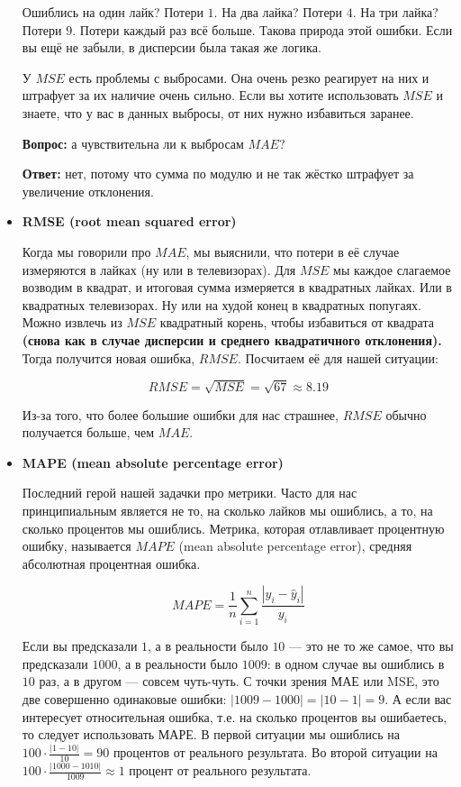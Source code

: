 \documentclass[12pt, a4paper, oneside]{article}
\theoremstyle{plain} %
\theoremstyle{definition}
\newcommand{\indef}[1]{\textbf{ \color{green} #1}}
\begin{document}
\begin{solution}
\begin{itemize}
\begin{center}
\end{center}
	
Ошиблись на один лайк? Потери $1$. На два лайка? Потери $4$. На три лайка? Потери $9$. Потери каждый раз всё больше. Такова природа этой ошибки. Если вы ещё не забыли, в дисперсии была такая же логика. 

У $MSE$ есть проблемы с выбросами. Она очень резко реагирует на них и штрафует за их наличие очень сильно.  Если вы хотите использовать $MSE$ и знаете, что у вас в данных выбросы, от них нужно избавиться заранее. 

\textbf{Вопрос:} а чувствительна ли к выбросам  $MAE$?

\textbf{Ответ:} нет, потому что сумма по модулю и не так жёстко штрафует за увеличение отклонения.

\item \indef{RMSE (root mean squared error)} 

Когда мы говорили про $MAE$, мы выяснили, что потери в её случае измеряются в лайках (ну или в телевизорах). Для $MSE$ мы каждое слагаемое возводим в квадрат, и итоговая сумма измеряется в квадратных лайках. Или в квадратных телевизорах. Ну или на худой конец в квадратных попугаях. Можно извлечь из $MSE$ квадратный корень, чтобы избавиться от квадрата \indef{(снова как в случае дисперсии и среднего квадратичного отклонения).} Тогда получится новая ошибка, $RMSE$. Посчитаем её для нашей ситуации: 

$$
RMSE = \sqrt{MSE} = \sqrt{67}  \approx 8.19
$$

Из-за того, что более большие ошибки для нас страшнее, $RMSE$ обычно получается больше, чем $MAE$. 

\item \indef{MAPE (mean absolute percentage error)} 

Последний герой нашей задачки про метрики. Часто для нас принципиальным является не то, на сколько лайков мы ошиблись, а то, на сколько процентов мы ошиблись. Метрика, которая отлавливает процентную ошибку, называется $MAPE$ (mean absolute percentage error), средняя абсолютная процентная ошибка. 

$$
MAPE = \frac{1}{n} \sum_{i=1}^n \frac{|y_i - \hat{y}_i|}{y_i}
$$

Если вы предсказали  $1$, а в реальности было  $10$ --- это не то же самое, что вы предсказали  $1000$, а в реальности было $1009$: в одном случае вы ошиблись в $10$ раз, а в другом --- совсем чуть-чуть. С точки зрения МАЕ или MSE, это две совершенно одинаковые ошибки: $|1009 - 1000| = |10 - 1| = 9$. А если вас интересует относительная ошибка, т.е. на сколько процентов вы ошибаетесь, то следует использовать МАРЕ.
В первой ситуации мы ошиблись на $100 \cdot \frac{|1 - 10|}{10} = 90$ процентов от реального результата. Во второй ситуации на $100 \cdot \frac{|1000 - 1010|}{1009} \approx 1$ процент от реального результата.


\end{itemize}
\end{solution}
\end{document}
